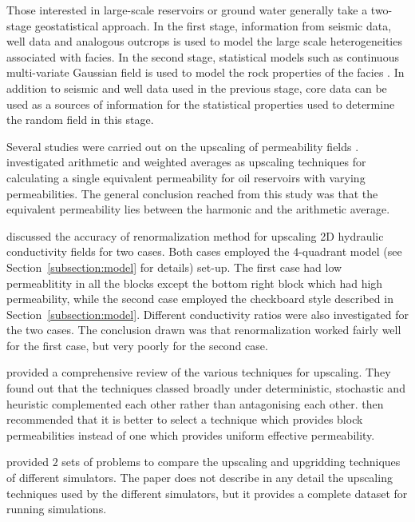 \documentclass[preprint,12pt]{elsarticle}
\begin{document}
Those interested in large-scale reservoirs or ground water generally take a two-stage geostatistical approach. In the first stage, information from seismic data, well data and analogous outcrops is used to model the large scale heterogeneities associated with facies. In the second stage, statistical models such as continuous multi-variate Gaussian field is used to model the rock properties of the facies \cite{Ewing_1997}. In addition to seismic and well data used in the previous stage, core data can be used as a sources of information for the statistical properties used to determine the random field in this stage.

Several studies were carried out on the upscaling of permeability fields \cite{Christie_2001SPE10Model, Ewing_1997, Hasting_2001, Indelman_1993, King1996, Vereecken_2007, Wen_1996, Yeo2001}. \citet{Cardwell_1945} investigated arithmetic and weighted averages as upscaling techniques for calculating a single equivalent permeability for oil reservoirs with varying permeabilities. The general conclusion reached from this study was that the equivalent permeability lies between the harmonic and the arithmetic average.  

\citet{Yeo2001} discussed the accuracy of renormalization method for upscaling 2D hydraulic conductivity fields for two cases. Both cases employed the $4$-quadrant model (see Section~\ref{subsection:model} for details) set-up. The first case had low permeablitity in all the blocks except the bottom right block which had high permeability, while the second case employed the checkboard style described in Section~\ref{subsection:model}. Different conductivity ratios were also investigated for the two cases. The conclusion drawn was that renormalization worked fairly well for the first case, but very poorly for the second case.

\citet{Renard_1997} provided a comprehensive review of the various techniques for upscaling. They found out that the techniques classed broadly under deterministic, stochastic and heuristic complemented each other rather than antagonising each other. \citet{Renard_1997} then recommended that it is better to select a technique which provides block permeabilities instead of one which provides uniform effective permeability.

\citet{Christie_2001SPE10Model} provided $2$ sets of problems to compare the upscaling and upgridding techniques of different simulators. The paper does not describe in any detail the upscaling techniques used by the different simulators, but it provides a complete dataset for running simulations.
\end{document}

